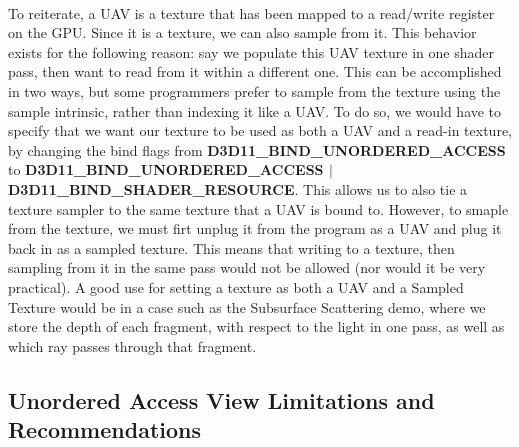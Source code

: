\documentclass[a4paper, 12pt]{article}
\begin{document}
\noindent \\ To reiterate, a UAV is a texture that has been mapped to a
read/write register on the GPU. Since it is a texture, we can also sample from
it. This behavior exists for the following reason: say we populate this UAV
texture in one shader pass, then want to read from it within a different one.
This can be accomplished in two ways, but some programmers prefer to sample
from the texture using the sample intrinsic, rather than indexing it like a
UAV. To do so, we would have to specify that we want our texture to be used as
both a UAV and a read-in texture, by changing the bind flags from
\textbf{D3D11\_BIND\_UNORDERED\_ACCESS} to
\textbf{D3D11\_BIND\_UNORDERED\_ACCESS $|$ D3D11\_BIND\_SHADER\_RESOURCE}.
This allows us to also tie a texture sampler to the same texture that a UAV is
bound to. However, to smaple from the texture, we must firt unplug it from the
program as a UAV and plug it back in as a sampled texture. This means that
writing to a texture, then sampling from it in the same pass would not be
allowed (nor would it be very practical). A good use for setting a texture as
both a UAV and a Sampled Texture would be in a case such as the Subsurface
Scattering demo, where we store the depth of each fragment, with respect to
the light in one pass, as well as which ray passes through that fragment.

\subsection{Unordered Access View Limitations and Recommendations}

\label{section:UAVLimits}
\end{document}
